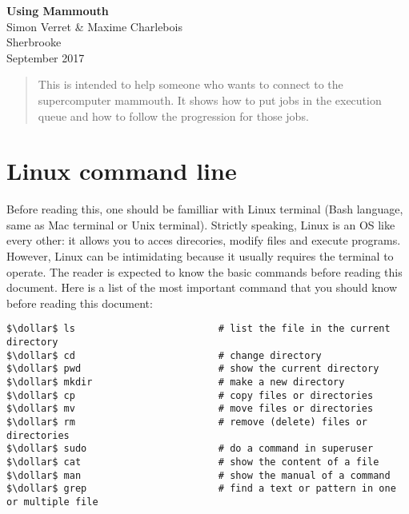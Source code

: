 \documentclass[10pt,letter]{article}
\newcommand{\dollar}{\mbox{\textdollar}}
\begin{document}

\begin{centering}

\Large{\textbf{Using Mammouth}}\\
\normalsize{Simon Verret \& Maxime Charlebois}\\
\small{Sherbrooke\\ September 2017}

\end{centering}



\begin{abstract}
This is intended to help someone who wants to connect to the supercomputer mammouth. It shows how to put jobs in the execution queue and how to follow the progression for those jobs.
\end{abstract}

\tableofcontents

\renewcommand{\baselinestretch}{1.00}
\setlength{\parskip}{0.8\baselineskip}
\setlength{\parindent}{0mm}


\vspace{2mm}

\section{Linux command line}
Before reading this, one should be familliar with Linux terminal 
(Bash language, same as Mac terminal or Unix terminal). 
Strictly speaking, Linux is an OS like every other: 
it allows you to acces direcories, modify files and execute programs. 
However, Linux can be intimidating because it usually requires the terminal to operate.
The reader is expected to know the basic commands before reading this document. 
Here is a list of the most important command that you should know before reading this document:

\begin{bashInput}
\begin{lstlisting}[style=BashInputStyle]
$\dollar$ ls                         # list the file in the current directory
$\dollar$ cd                         # change directory
$\dollar$ pwd                        # show the current directory
$\dollar$ mkdir                      # make a new directory
$\dollar$ cp                         # copy files or directories
$\dollar$ mv                         # move files or directories
$\dollar$ rm                         # remove (delete) files or directories
$\dollar$ sudo                       # do a command in superuser
$\dollar$ cat                        # show the content of a file
$\dollar$ man                        # show the manual of a command
$\dollar$ grep                       # find a text or pattern in one or multiple file
\end{lstlisting}
\end{bashInput}
\end{document}
